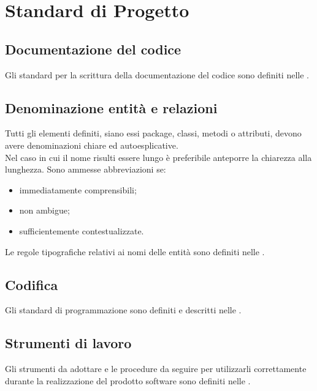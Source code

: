 \newpage
\section{Standard di Progetto}
\subsection{Documentazione del codice}
Gli standard per la scrittura della documentazione del codice sono definiti nelle \normeDiProgetto.

\subsection{Denominazione entità e relazioni}
Tutti gli elementi definiti, siano essi package, classi, metodi o attributi, devono avere denominazioni chiare ed autoesplicative. \\
Nel caso in cui il nome risulti essere lungo è preferibile anteporre la chiarezza alla lunghezza.
Sono ammesse abbreviazioni se:
\begin{itemize}
	\item immediatamente comprensibili;
	\item non ambigue;
	\item sufficientemente contestualizzate.
\end{itemize}
Le regole tipografiche relativi ai nomi delle entità sono definiti nelle \normeDiProgetto.

\subsection{Codifica}
Gli standard di programmazione sono definiti e descritti nelle  \normeDiProgetto.

\subsection{Strumenti di lavoro}
Gli strumenti da adottare e le procedure da seguire per utilizzarli correttamente durante la realizzazione del prodotto software sono definiti nelle  \normeDiProgetto.
\newpage